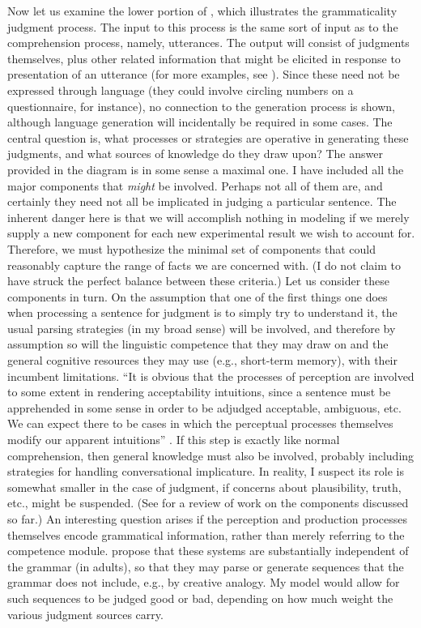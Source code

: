 Now let us examine the lower portion of , which illustrates  the grammaticality judgment process. The input to this process is the same sort of input as to the comprehension process, namely, utterances. The output will consist of judgments themselves, plus other related information that might be elicited in response to presentation of an utterance (for more examples, see ). Since these need not be expressed through language (they could involve circling numbers on a questionnaire, for instance), no connection to the generation process is shown, although language generation will incidentally be required in some cases. The central question is, what processes or strategies are operative in generating these judgments, and what sources of knowledge do they draw upon? The answer provided in the diagram is in some sense a maximal one. I have included all the major components that \textit{might} be involved. Perhaps not all of them are, and certainly they need not all be implicated in judging a particular sentence. The inherent danger here is that we will accomplish nothing in modeling if we merely supply a new component for each new experimental result we wish to account for. Therefore, we must hypothesize the minimal set of components that could reasonably capture the range of facts we are concerned with. (I do not claim to have struck the perfect balance between these criteria.) Let us consider these components in turn. On the assumption that one of the first things one does when processing a sentence for judgment is to simply try to understand it, the usual parsing strategies (in my broad  sense) will be involved, and therefore by assumption so will the linguistic competence that they may draw on and the general cognitive resources they may use (e.g., short-term memory), with their incumbent limitations. ``It is obvious that the processes of perception are involved to some extent in rendering acceptability intuitions, since a sentence must be apprehended  in some sense in order to be adjudged acceptable, ambiguous,  etc. We can expect there to be cases in which  the perceptual  processes  themselves  modify  our apparent
intuitions''  \citep[229]{BeverEtAl1981}. If this step is exactly like normal comprehension, then general knowledge must also be involved, probably including strategies for handling conversational implicature. In reality, I suspect its role is somewhat smaller in the case of judgment, if concerns about plausibility, truth, etc., might be suspended. (See \citealt{BeverEtAl1976a} for a review of work on the components discussed so far.) An interesting question arises if the perception and production processes themselves encode grammatical information, rather than merely referring to the competence module. \citet{BeverEtAl1976a} propose that these systems are substantially independent of the grammar (in adults), so that they may parse or generate sequences that the grammar does not include, e.g., by creative analogy. My model would allow for such sequences to be judged good or bad, depending on how much weight the various judgment sources carry.

